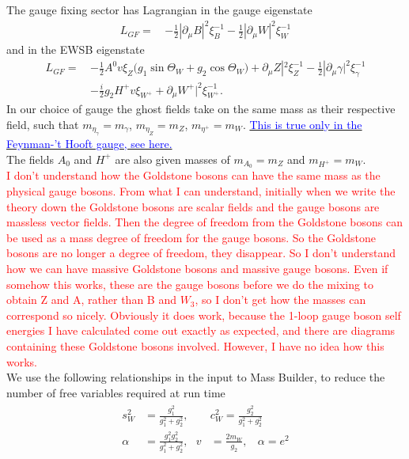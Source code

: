 \documentclass[11pt]{article}
\newcommand{\mbs}{\textsf{Mass Builder}}
\begin{document}
The gauge fixing sector has Lagrangian in the gauge eigenstate
\begin{align} 
L_{GF} = \, &-\frac{1}{2} |\partial_{\mu}B|^2 \xi_{B}^{-1}  -\frac{1}{2} |\partial_{\mu}W|^2 \xi_{W}^{-1} 
\end{align} 
and in the EWSB eigenstate
\begin{align} 
L_{GF} = \, & -\frac{1}{2} A^0 v \xi_{Z} \Big(g_1 \sin\Theta_W   + g_2 \cos\Theta_W  \Big) + \partial_{\mu}Z|^2 \xi_{Z}^{-1}  -\frac{1}{2} |\partial_{\mu}\gamma|^2 \xi_{\gamma}^{-1} \\&-\frac{i}{2} g_2 H^+ v \xi_{W^+}  + \partial_{\mu}W^+|^2 \xi_{W^+}^{-1}.
\end{align} 
In our choice of gauge the ghost fields take on the same mass as their respective field, such that $m_{\eta_{\gamma}} = m_{\gamma}$, $m_{\eta_Z}=m_{Z}$, $m_{\eta^+}=m_{W}$.   \href{https://en.wikipedia.org/wiki/Faddeev\%E2\%80\%93Popov_ghost}{\textcolor{blue}{This is true only in the Feynman-'t Hooft gauge, see here.}}\\

The fields $A_0$ and $H^+$ are also given masses of $m_{A_0}=m_Z$ and $m_{H^+}=m_W$.\\
\textcolor{red}{
I don't understand how the Goldstone bosons can have the same mass as the physical gauge bosons.  From what I can understand, initially when we write the theory down the Goldstone bosons are scalar fields and the gauge bosons are massless vector fields.  Then the degree of freedom from the Goldstone bosons can be used as a mass degree of freedom for the gauge bosons.  So the Goldstone bosons are no longer a degree of freedom, they disappear.
So I don't understand how we can have massive Goldstone bosons and massive gauge bosons.  Even if somehow this works, these are the gauge bosons before we do the mixing to obtain Z and A, rather than B and $W_3$, so I don't get how the masses can correspond so nicely.
Obviously it does work, because the 1-loop gauge boson self energies I have calculated come out exactly as expected, and there are diagrams containing these Goldstone bosons involved.  However, I have no idea how this works.}\\



We use the following relationships in the input to \mbs, to reduce the number of free variables required at run time
\begin{eqnarray}
\begin{split}
s_W^2&=\frac{g_1^2}{g_1^2+g_2^2}, \ \ \ & c_W^2=\frac{g_2^2}{g_1^2+g_2^2}\\
\alpha&=\frac{g_1^2g_2^2}{g_1^2+g_2^2}, \ \ \ v&=\frac{2m_W}{g_2}, \ \ \ \ \alpha=e^2
\end{split}
\end{eqnarray}
\end{document}
